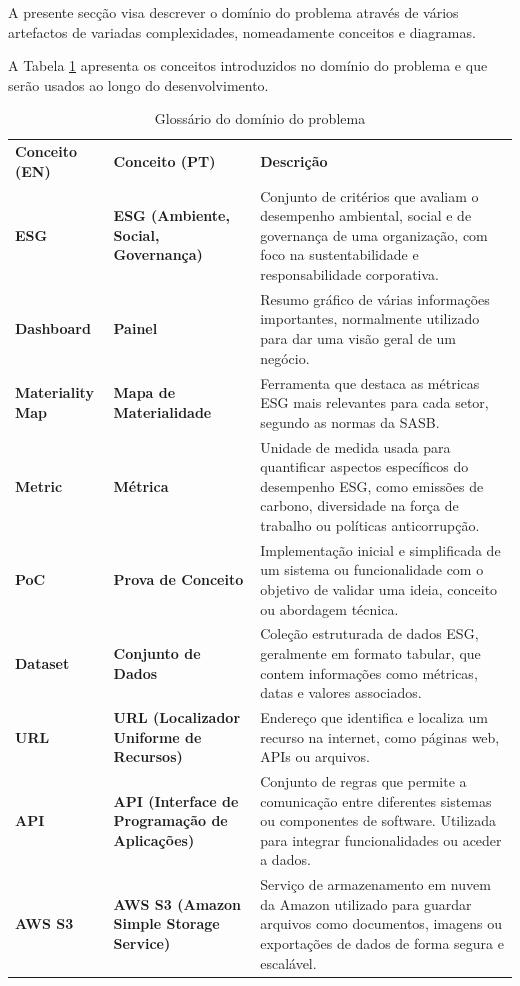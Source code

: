 A presente secção visa descrever o domínio do problema através de vários artefactos de variadas complexidades, nomeadamente conceitos e diagramas.

A Tabela \ref{tab:glossario_dominio} apresenta os conceitos introduzidos no domínio do problema e que serão usados ao longo do desenvolvimento.

\begin{table}[H]
    \renewcommand{\arraystretch}{1.2}
    \setlength{\tabcolsep}{10pt}
    \centering
    \begin{tabular}{>{\bfseries}p{2.5cm} >{\bfseries}p{4cm} p{8cm}}
        \rowcolor{purple!40}
        Conceito (EN) & Conceito (PT) & \textbf{Descrição} \\
        ESG & ESG (Ambiente, Social, Governança) & Conjunto de critérios que avaliam o desempenho ambiental, social e de governança de uma organização, com foco na sustentabilidade e responsabilidade corporativa. \\
        Dashboard & Painel & Resumo gráfico de várias informações importantes, normalmente utilizado para dar uma visão geral de um negócio. \\
        Materiality Map & Mapa de Materialidade & Ferramenta que destaca as métricas ESG mais relevantes para cada setor, segundo as normas da SASB. \\
        Metric & Métrica & Unidade de medida usada para quantificar aspectos específicos do desempenho ESG, como emissões de carbono, diversidade na força de trabalho ou políticas anticorrupção. \\
        PoC & Prova de Conceito & Implementação inicial e simplificada de um sistema ou funcionalidade com o objetivo de validar uma ideia, conceito ou abordagem técnica. \\
        Dataset & Conjunto de Dados & Coleção estruturada de dados ESG, geralmente em formato tabular, que contem informações como métricas, datas e valores associados. \\
        URL & URL (Localizador Uniforme de Recursos) & Endereço que identifica e localiza um recurso na internet, como páginas web, APIs ou arquivos. \\
        API & API (Interface de Programação de Aplicações) & Conjunto de regras que permite a comunicação entre diferentes sistemas ou componentes de software. Utilizada para integrar funcionalidades ou aceder a dados. \\
        AWS S3 & AWS S3 (Amazon Simple Storage Service) & Serviço de armazenamento em nuvem da Amazon utilizado para guardar arquivos como documentos, imagens ou exportações de dados de forma segura e escalável. \\
    \end{tabular}
    \caption{Glossário do domínio do problema}
    \label{tab:glossario_dominio}
\end{table}



